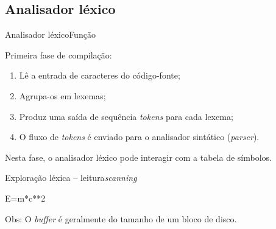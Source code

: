 \subsection{Analisador léxico}

\begin{frame}{Analisador léxico}{Função}

  Primeira fase de compilação:

  \begin{enumerate}[<+->]
  \item Lê a entrada de caracteres do código-fonte;
  \item Agrupa-os em lexemas;
  \item Produz uma saída de sequência {\it tokens\/} para cada lexema;
  \item O fluxo de {\it tokens\/} é enviado para o analisador
    sintático ({\it parser\/}).
  \end{enumerate}\bigskip

  Nesta fase, o analisador léxico pode interagir com a tabela
  de símbolos.
\end{frame}

\begin{frame}{Exploração léxica -- leitura}{\it scanning\/}

\textvisiblespace\textvisiblespace\textvisiblespace E=m*c**2\\

\bigskip


\medskip

{\small Obs: O {\it buffer} é geralmente do tamanho de um bloco de disco.}

\end{frame}

